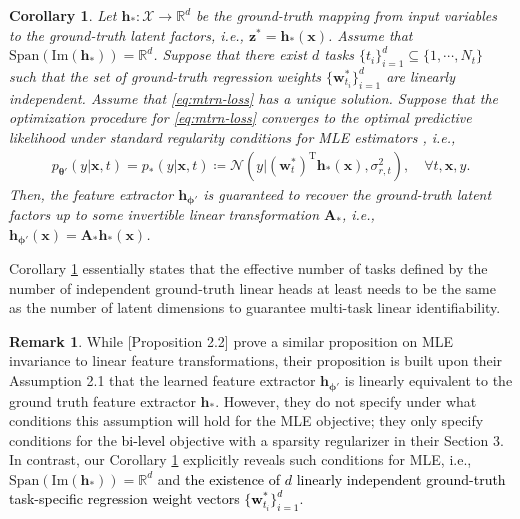 \documentclass[10pt]{article} %
\theoremstyle{plain}
\newtheorem{corollary}[theorem]{Corollary}
\theoremstyle{definition}
\newtheorem{remark}[theorem]{Remark}
\begin{document}
\begin{corollary}\label{cor:lin-id-mtrn}
    Let $\mathbf{h}_{*}:\mathcal{X}\to\mathbb{R}^d$ be the ground-truth mapping from input variables to the ground-truth latent factors, i.e., $\mathbf{z}^*=\mathbf{h}_{*}(\mathbf{x})$. Assume that $\text{Span}(\text{Im}(\mathbf{h}_{*}))=\mathbb{R}^d$. Suppose that there exist $d$ tasks $\{t_i\}_{i=1}^d\subseteq\{1,\cdots,N_t\}$ such that the set of ground-truth regression weights $\{\mathbf{w}_{t_i}^*\}_{i=1}^d$ are linearly independent. Assume that \eqref{eq:mtrn-loss} has a unique solution. Suppose that the optimization procedure for \eqref{eq:mtrn-loss} converges to the optimal predictive likelihood under standard regularity conditions for MLE estimators \textcolor{black}{\citep{gurland1954regularity}}, i.e.,
\begin{align}
    p_{\boldsymbol{\theta}'}(y|\mathbf{x},t)=p_{*}(y|\mathbf{x},t)\coloneqq\mathcal{N}(y|(\mathbf{w}_t^*)^{\text{T}}\mathbf{h}_{*}(\mathbf{x}),\sigma_{r,t}^2),\quad\forall t,\mathbf{x},y.
\end{align}
Then, the feature extractor $\mathbf{h}_{\boldsymbol{\phi}'}$ is guaranteed to recover the ground-truth latent factors up to some invertible linear transformation $\mathbf{A}_*$, i.e., $\mathbf{h}_{\boldsymbol{\phi}'}(\mathbf{x})=\mathbf{A}_*\mathbf{h}_{*}(\mathbf{x})$.
\end{corollary}
Corollary \ref{cor:lin-id-mtrn} essentially states that the effective number of tasks defined by the number of independent ground-truth linear heads at least needs to be the same as the number of latent dimensions to guarantee multi-task linear identifiability.
\begin{remark}
    While \citet{Lachapelle_Deleu_Mahajan_Mitliagkas_Bengio_Lacoste-Julien_Bertrand_2023}[Proposition 2.2] prove a similar proposition on MLE invariance to linear feature transformations, their proposition is built upon their Assumption 2.1 that the learned feature extractor $\mathbf{h}_{\boldsymbol{\phi}'}$ is linearly equivalent to the ground truth feature extractor $\mathbf{h}_{*}$. However, they do not specify under what conditions this assumption will hold for the MLE objective; they only specify conditions for the \textcolor{black}{bi-level} objective with a sparsity regularizer in their Section 3. In contrast, our Corollary \ref{cor:lin-id-mtrn} explicitly reveals such conditions for MLE, i.e., $\text{Span}(\text{Im}(\mathbf{h}_{*}))=\mathbb{R}^d$ and \textcolor{black}{the existence of $d$ linearly independent ground-truth task-specific regression weight vectors $\{\mathbf{w}_{t_i}^*\}_{i=1}^d$}.
\end{remark}
\end{document}
